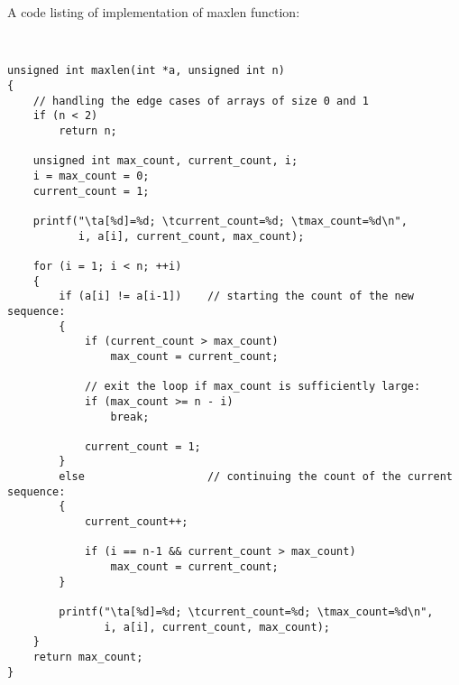 \documentclass{article}
\begin{document}
\paragraph{}\
\paragraph{}\
\paragraph{}\
\paragraph{}\
\paragraph{}\
\paragraph{}\
\paragraph{}\
\paragraph{}\


A code listing of implementation of maxlen function:
	\ttfamily
	
\begin{verbatim} 


unsigned int maxlen(int *a, unsigned int n)
{
    // handling the edge cases of arrays of size 0 and 1
    if (n < 2)                                      
        return n;

    unsigned int max_count, current_count, i;
    i = max_count = 0;
    current_count = 1;

    printf("\ta[%d]=%d; \tcurrent_count=%d; \tmax_count=%d\n",
           i, a[i], current_count, max_count);

    for (i = 1; i < n; ++i)
    {
        if (a[i] != a[i-1])    // starting the count of the new sequence:
        {
            if (current_count > max_count)
                max_count = current_count;
                
            // exit the loop if max_count is sufficiently large:
            if (max_count >= n - i)                 
                break;
                
            current_count = 1;
        }
        else                   // continuing the count of the current sequence:
        {
            current_count++;
            
            if (i == n-1 && current_count > max_count)
                max_count = current_count;
        }

        printf("\ta[%d]=%d; \tcurrent_count=%d; \tmax_count=%d\n",
               i, a[i], current_count, max_count);
    }
    return max_count;
}


\end{verbatim}	
	
\end{document}
